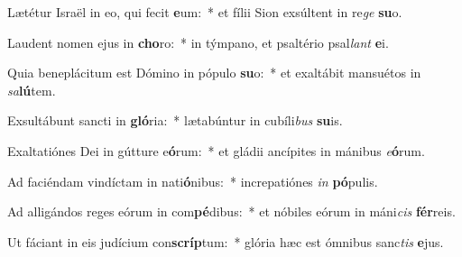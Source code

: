 \item Lætétur Israël in eo, qui fecit \textbf{e}um:~* et fílii Sion exsúltent in re\textit{ge} \textbf{su}o.
\item Laudent nomen ejus in \textbf{cho}ro:~* in týmpano, et psaltério psal\textit{lant} \textbf{e}i.
\item Quia beneplácitum est Dómino in pópulo \textbf{su}o:~* et exaltábit mansuétos in \textit{sa}\textbf{lú}tem.
\item Exsultábunt sancti in \textbf{gló}ria:~* lætabúntur in cubíli\textit{bus} \textbf{su}is.
\item Exaltatiónes Dei in gútture e\textbf{ó}rum:~* et gládii ancípites in mánibus \textit{e}\textbf{ó}rum.
\item Ad faciéndam vindíctam in nati\textbf{ó}nibus:~* increpatiónes \textit{in} \textbf{pó}pulis.
\item Ad alligándos reges eórum in com\textbf{pé}dibus:~* et nóbiles eórum in máni\textit{cis} \textbf{fér}reis.
\item Ut fáciant in eis judícium con\textbf{scríp}tum:~* glória hæc est ómnibus sanc\textit{tis} \textbf{e}jus.
